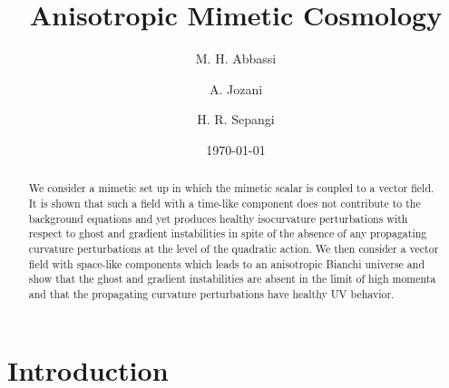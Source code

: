 \documentclass[%
 reprint,
 amsmath,amssymb,
 aps,
]{revtex4-1}
\begin{document}

\title{Anisotropic Mimetic Cosmology}%


\author{M. H. Abbassi}%
%

\author{A. Jozani}
%

\author{H. R. Sepangi}
%

\date{\today}%

\begin{abstract}
We consider a mimetic set up in which the mimetic scalar is coupled to a vector field. It is shown that such a field with a time-like component does not contribute to the background equations and yet produces healthy isocurvature perturbations with respect to ghost and gradient instabilities in spite of the absence of any propagating curvature perturbations at the level of the quadratic action. We then consider a vector field with space-like components which leads to an anisotropic Bianchi universe and show that the ghost and gradient instabilities are absent in the limit of high momenta and that the propagating curvature perturbations have healthy UV behavior.
\end{abstract}


\maketitle


\section{\label{intro} Introduction}
\end{document}
